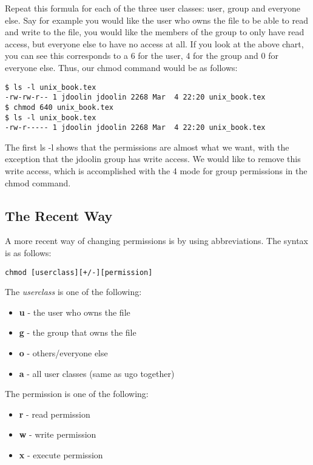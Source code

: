 Repeat this formula for each of the three user classes: user, group and everyone else.  Say for example you would like the user who owns the file to be able to read and write to the file, you would like the members of the group to only have read access, but everyone else to have no access at all. If you look at the above chart, you can see this corresponds to a 6 for the user, 4 for the group and 0 for everyone else.  Thus, our chmod command would be as follows:

\begin{verbatim}
$ ls -l unix_book.tex
-rw-rw-r-- 1 jdoolin jdoolin 2268 Mar  4 22:20 unix_book.tex
$ chmod 640 unix_book.tex
$ ls -l unix_book.tex
-rw-r----- 1 jdoolin jdoolin 2268 Mar  4 22:20 unix_book.tex
\end{verbatim}

The first ls -l shows that the permissions are almost what we want, with the exception that the jdoolin group has write access.  We would like to remove this write access, which is accomplished with the 4 mode for group permissions in the chmod command.

\subsection{The Recent Way}

A more recent way of changing permissions is by using abbreviations.  The syntax is as follows:

\begin{verbatim}
chmod [userclass][+/-][permission]
\end{verbatim}

The \textit{userclass} is one of the following:

\begin{itemize}
   \item \textbf{u} - the user who owns the file
   \item \textbf{g} - the group that owns the file
   \item \textbf{o} - others/everyone else
   \item \textbf{a} - all user classes (same as ugo together)
\end{itemize}

The permission is one of the following:

\begin{itemize}
   \item \textbf{r} - read permission
   \item \textbf{w} - write permission
   \item \textbf{x} - execute permission
\end{itemize}

